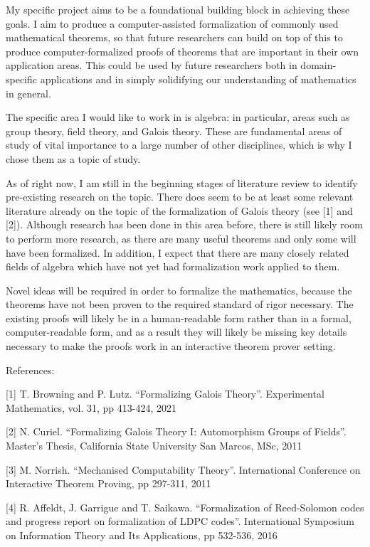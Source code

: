 \documentclass{article}
\begin{document}
My specific project aims to be a foundational building block in achieving these goals. I aim to produce a computer-assisted formalization of commonly used mathematical theorems, so that future researchers can build on top of this to produce computer-formalized proofs of theorems that are important in their own application areas. This could be used by future researchers both in domain-specific applications and in simply solidifying our understanding of mathematics in general. 

The specific area I would like to work in is algebra: in particular, areas such as group theory, field theory, and Galois theory. These are fundamental areas of study of vital importance to a large number of other disciplines, which is why I chose them as a topic of study.

As of right now, I am still in the beginning stages of literature review to identify pre-existing research on the topic. There does seem to be at least some relevant literature already on the topic of the formalization of Galois theory (see [1] and [2]). Although research has been done in this area before, there is still likely room to perform more research, as there are many useful theorems and only some will have been formalized. In addition, I expect that there are many closely related fields of algebra which have not yet had formalization work applied to them.

Novel ideas will be required in order to formalize the mathematics, because the theorems have not been proven to the required standard of rigor necessary. The existing proofs will likely be in a human-readable form rather than in a formal, computer-readable form, and as a result they will likely be missing key details necessary to make the proofs work in an interactive theorem prover setting.

References:

[1]    T. Browning and P. Lutz. “Formalizing Galois Theory”. Experimental Mathematics, vol. 31, pp 413-424, 2021

[2]    N. Curiel. “Formalizing Galois Theory I: Automorphism Groups of Fields”. Master’s Thesis, California State University San Marcos, MSc, 2011

[3]    M. Norrish. “Mechanised Computability Theory”. International Conference on Interactive Theorem Proving, pp 297-311, 2011

[4]    R. Affeldt, J. Garrigue and T. Saikawa. “Formalization of Reed-Solomon codes and progress report on formalization of LDPC codes”. International Symposium on Information Theory and Its Applications, pp 532-536, 2016
\end{document}
